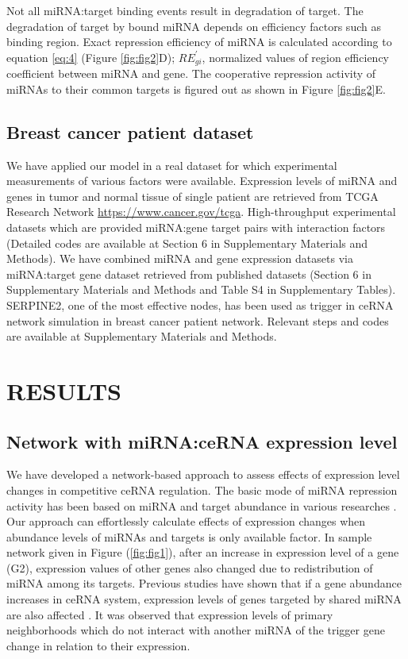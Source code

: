\documentclass[a4,center,fleqn]{NAR}
\begin{document}
Not all miRNA:target binding events result in degradation of target. The
degradation of target by bound miRNA depends on efficiency factors such
as binding region. Exact repression efficiency of miRNA is calculated
according to equation \eqref{eq:4} (Figure \ref{fig:fig2}D);
\(RE^\prime_{gi}\), normalized values of region efficiency coefficient
between miRNA and gene. The cooperative repression activity of miRNAs to
their common targets is figured out as shown in Figure \ref{fig:fig2}E.

\subsection{Breast cancer patient dataset}

We have applied our model in a real dataset for which experimental
measurements of various factors were available. Expression levels of
miRNA and genes in tumor and normal tissue of single patient are
retrieved from TCGA Research Network \url{https://www.cancer.gov/tcga}.
High-throughput experimental datasets which are provided miRNA:gene
target pairs with interaction factors
\citep{helwak_mapping_2013, moore_mirnatarget_2015} (Detailed codes are
available at Section 6 in Supplementary Materials and Methods). We have
combined miRNA and gene expression datasets via miRNA:target gene
dataset retrieved from published datasets
\citep{helwak_mapping_2013, moore_mirnatarget_2015} (Section 6 in
Supplementary Materials and Methods and Table S4 in Supplementary
Tables). SERPINE2, one of the most effective nodes, has been used as
trigger in ceRNA network simulation in breast cancer patient network.
Relevant steps and codes are available at Supplementary Materials and
Methods.

\section{RESULTS}

\subsection{Network with miRNA:ceRNA expression level}

We have developed a network-based approach to assess effects of
expression level changes in competitive ceRNA regulation. The basic mode
of miRNA repression activity has been based on miRNA and target
abundance in various researches
\citep{arvey_target_2010, denzler_assessing_2014}. Our approach can
effortlessly calculate effects of expression changes when abundance
levels of miRNAs and targets is only available factor. In sample network
given in Figure (\ref{fig:fig1}), after an increase in expression level
of a gene (G2), expression values of other genes also changed due to
redistribution of miRNA among its targets. Previous studies have shown
that if a gene abundance increases in ceRNA system, expression levels of
genes targeted by shared miRNA are also affected
\citep{lai_understanding_2016, salmena_cerna_2011, tay_multilayered_2014}.
It was observed that expression levels of primary neighborhoods which do
not interact with another miRNA of the trigger gene change in relation
to their expression.
\end{document}
